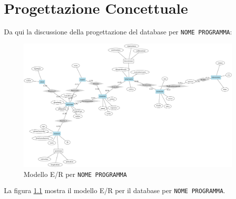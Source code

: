 \chapter{Progettazione Concettuale}
Da qui la discussione della progettazione del database
per \texttt{NOME PROGRAMMA}:
\begin{figure}
  \includegraphics[width=\linewidth]{images/er.png}
  \caption{Modello E/R per \texttt{NOME PROGRAMMA}}
  \label{fig:er}
\end{figure}

La figura \ref{fig:er} mostra il modello E/R per il
database per \texttt{NOME PROGRAMMA}.


